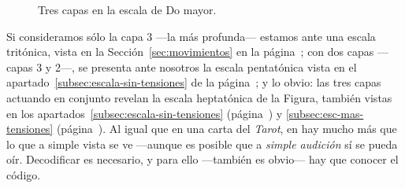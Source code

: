 \documentclass[a4paper,10pt]{article}
\begin{document}
  \begin{figure}[ht]
  \centering
  \caption{Tres capas en la escala de Do mayor.}\label{fig:capas-escala}
  \end{figure}

\begin{multicols}{2}

\noindent Si consideramos sólo la capa 3 ---la más profunda--- estamos ante una escala tritónica, vista en la Sección~\ref{sec:movimientos} en la página~\pageref{sec:movimientos}; con dos capas ---capas 3 y 2---, se presenta ante nosotros la escala pentatónica vista en el apartado~\ref{subsec:escala-sin-tensiones} de la página~\pageref{subsec:escala-sin-tensiones}; y lo obvio: las tres capas actuando en conjunto revelan la escala heptatónica de la Figura, también vistas en los apartados~\ref{subsec:escala-sin-tensiones} (página~\pageref{subsec:escala-sin-tensiones}) y \ref{subsec:esc-mas-tensiones} (página~\pageref{subsec:esc-mas-tensiones}). Al igual que en una carta del \emph{Tarot}, en  hay mucho más que lo que a simple vista se ve ---aunque es posible que a \emph{simple audición} sí se pueda oír. Decodificar es necesario, y para ello ---también es obvio--- hay que conocer el código.
\end{multicols}
\end{document}
